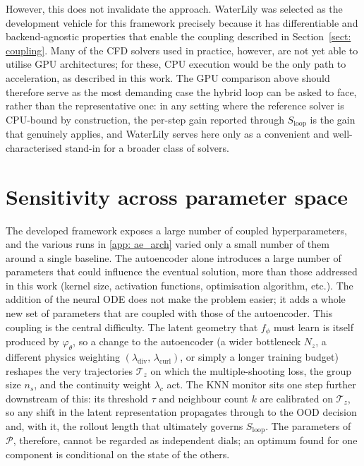 However, this does not invalidate the approach. WaterLily was selected as the development vehicle for this framework precisely because it has differentiable and backend-agnostic properties that enable the coupling described in Section~\ref{sect: coupling}. Many of the CFD solvers used in practice, however, are not yet able to utilise GPU architectures; for these, CPU execution would be the only path to acceleration, as described in this work. The GPU comparison above should therefore serve as the most demanding case the hybrid loop can be asked to face, rather than the representative one: in any setting where the reference solver is CPU-bound by construction, the per-step gain reported through $S_\text{loop}$ is the gain that genuinely applies, and WaterLily serves here only as a convenient and well-characterised stand-in for a broader class of solvers.


\section{Sensitivity across parameter space}
\label{sect: disc_params}

The developed framework exposes a large number of coupled hyperparameters, and the various runs in \autoref{app: ae_arch} varied only a small number of them around a single baseline. The autoencoder alone introduces a large number of parameters that could influence the eventual solution, more than those addressed in this work (kernel size, activation functions, optimisation algorithm, etc.). The addition of the neural ODE does not make the problem easier; it adds a whole new set of parameters that are coupled with those of the autoencoder. This coupling is the central difficulty. The latent geometry that $f_\phi$ must learn is itself produced by $\varphi_\theta$, so a change to the autoencoder (a wider bottleneck $N_z$, a different physics weighting $(\lambda_\text{div},\,\lambda_\text{curl})$, or simply a longer training budget) reshapes the very trajectories $\boldsymbol{\mathcal{T}}_z$ on which the multiple-shooting loss, the group size $n_s$, and the continuity weight $\lambda_c$ act. The KNN monitor sits one step further downstream of this: its threshold $\tau$ and neighbour count $k$ are calibrated on $\boldsymbol{\mathcal{T}}_z$, so any shift in the latent representation propagates through to the OOD decision and, with it, the rollout length that ultimately governs $S_\text{loop}$. The parameters of $\mathcal{P}$, therefore, cannot be regarded as independent dials; an optimum found for one component is conditional on the state of the others.

